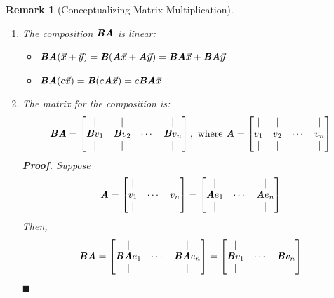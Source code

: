 \documentclass[12pt, a4paper]{article}
\newtheorem{eg}{Example}[subsection]
\newtheorem*{rmk}{\indent Remark}
\newenvironment*{prf}{\indent\textbf{\textit{Proof. }}}{\hfill $\blacksquare$\par}
\def\vecx{\vec{x}}
\def\vecy{\vec{y}}
\def\matrixA{\textbf{\emph{A}}}
\def\matrixB{\textbf{\emph{B}}}
\begin{document}
\begin{rmk}[Conceptualizing Matrix Multiplication]
\begin{enumerate}
\begin{eg}
	\end{eg}
	\item The composition $\matrixB\matrixA$ is linear: 
	\begin{itemize}
		\item $\matrixB\matrixA(\vecx+\vecy)=\matrixB(\matrixA\vecx+\matrixA\vecy)=\matrixB\matrixA\vecx+\matrixB\matrixA\vecy$
		\item $\matrixB\matrixA(c\vecx)=\matrixB(c\matrixA\vecx)=c\matrixB\matrixA\vecx$
	\end{itemize}
	\item The matrix for the composition is: 
	\[\matrixB\matrixA=\begin{bmatrix}|&|&&|\\\matrixB v_1&\matrixB v_2&\cdots&\matrixB v_n\\|&|&&|\end{bmatrix},\text{ where }\matrixA=\begin{bmatrix}|&|&&|\\v_1&v_2&\cdots&v_n\\|&|&&|\end{bmatrix}\]
	\begin{prf}
		Suppose \[\matrixA=\begin{bmatrix}|&&|\\v_1&\cdots&v_n\\|&&|\end{bmatrix}=\begin{bmatrix}|&&|\\\matrixA e_1&\cdots&\matrixA e_n\\|&&|\end{bmatrix}\]
		Then, \[\matrixB\matrixA=\begin{bmatrix}|&&|\\\matrixB\matrixA e_1&\cdots &\matrixB\matrixA e_n\\|&&|\end{bmatrix}=\begin{bmatrix}|&&|\\\matrixB v_1&\cdots &\matrixB v_n\\|&&|\end{bmatrix}\]	
	\end{prf}
\end{enumerate}	
\end{rmk}
\end{document}
